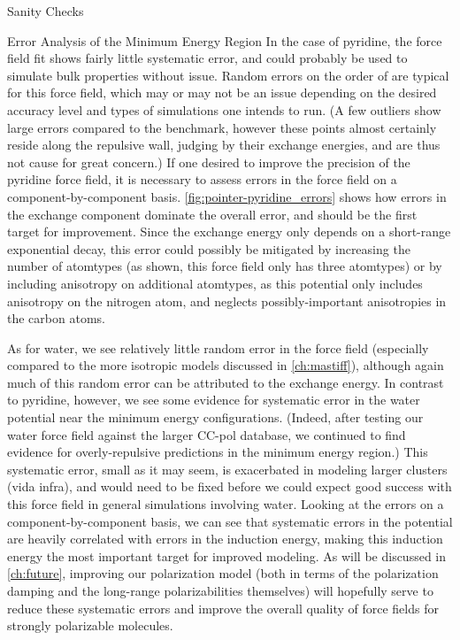 \begin{subsection}{Sanity Checks}
\begin{paragraph}{Error Analysis of the Minimum Energy Region}
In the case of pyridine, the force field fit shows fairly little systematic
error, and could probably be used to simulate bulk properties without issue.
Random errors on the order of  are typical for this force
field, which may or may not be an issue depending on the desired accuracy
level and types of simulations one intends to run. 
(A few outliers show large errors compared to the
\sapt benchmark, however these points almost certainly reside along the
repulsive wall, judging by their exchange energies, and are thus not cause for
great concern.)
If one desired to improve
the precision of the pyridine force field, it is necessary to assess errors in
the force field on a component-by-component basis. \cref{fig:pointer-pyridine_errors}
shows how errors in the exchange component dominate the overall
error, and should be the first target for improvement. Since the exchange energy
only depends on a short-range exponential decay, this error could possibly be
mitigated by increasing the number of atomtypes (as shown, this force field
only has three atomtypes) or by including anisotropy on additional atomtypes,
as this potential only includes anisotropy on the nitrogen atom, and neglects
possibly-important anisotropies in the carbon atoms.

As for water, we see relatively little random error in the force field
(especially compared to the more isotropic models discussed in
\cref{ch:mastiff}), although again much of this random error can be attributed
to the exchange energy. In contrast to pyridine, however, we see some evidence
for systematic error in the water potential near the minimum energy
configurations. (Indeed, after testing our water force field against the
larger CC-pol database,\cite{Babin2013} we continued to find evidence for
overly-repulsive predictions in the minimum energy region.) This systematic
error, small as it may seem, is exacerbated in modeling larger clusters (vida
infra), and would need to be fixed before we could expect good success with
this force field in general simulations involving water. Looking at the errors on a
component-by-component basis, we can see that systematic errors in the potential
are heavily correlated with errors in the induction energy, making this
induction energy the most important target for improved modeling. As will be
discussed in \cref{ch:future}, improving our polarization model (both in terms
of the polarization damping and the long-range polarizabilities themselves)
will hopefully serve to reduce these systematic errors and improve the overall
quality of force fields for strongly polarizable molecules.


\end{paragraph}
\end{subsection}
